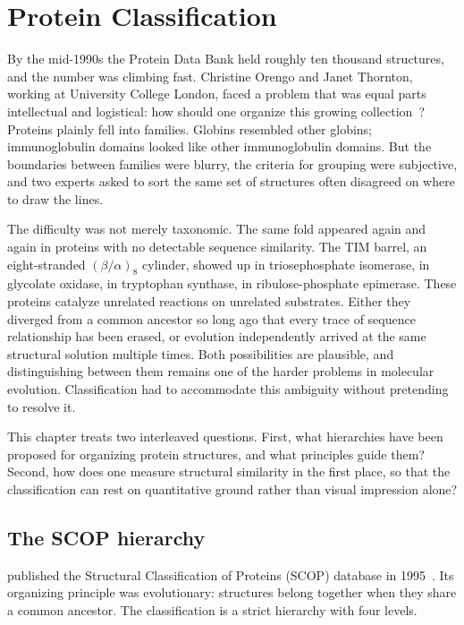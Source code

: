 \chapter{Protein Classification}
\label{ch:classification}

By the mid-1990s the Protein Data Bank held roughly ten thousand structures, and
the number was climbing fast. Christine Orengo and Janet Thornton, working at
University College London, faced a problem that was equal parts intellectual and
logistical: how should one organize this growing collection~\cite{orengo1997}? Proteins plainly fell
into families. Globins resembled other globins; immunoglobulin domains looked like
other immunoglobulin domains. But the boundaries between families were blurry, the
criteria for grouping were subjective, and two experts asked to sort the same set
of structures often disagreed on where to draw the lines.

The difficulty was not merely taxonomic. The same fold appeared again and again in
proteins with no detectable sequence similarity. The TIM barrel, an
eight-stranded $(\beta/\alpha)_8$ cylinder, showed up in triosephosphate
isomerase, in glycolate oxidase, in tryptophan synthase, in ribulose-phosphate
epimerase. These proteins catalyze unrelated reactions on unrelated substrates.
Either they diverged from a common ancestor so long ago that every trace of
sequence relationship has been erased, or evolution independently arrived at the
same structural solution multiple times. Both possibilities are plausible, and
distinguishing between them remains one of the harder problems in molecular
evolution. Classification had to accommodate this ambiguity without pretending to
resolve it.

This chapter treats two interleaved questions. First, what hierarchies have been
proposed for organizing protein structures, and what principles guide them? Second,
how does one measure structural similarity in the first place, so that the
classification can rest on quantitative ground rather than visual impression alone?


\section{The SCOP hierarchy}
\label{sec:scop}

 published the Structural Classification
of Proteins (SCOP) database in 1995~\cite{murzin1995}. Its organizing principle was evolutionary:
structures belong together when they share a common ancestor. The classification is
a strict hierarchy with four levels.

